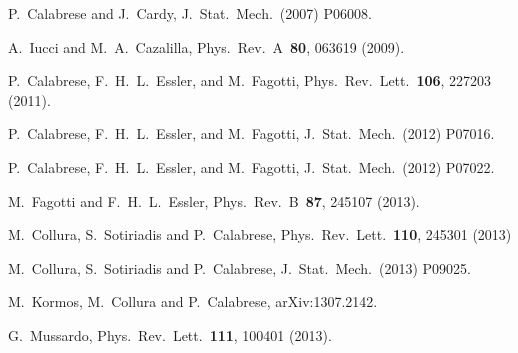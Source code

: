 \documentclass[twocolumn,superscriptaddress,prb,10pt]{revtex4-1}
\begin{document}
\begin{thebibliography}{99}
P.~Calabrese and J.~Cardy, J.\ Stat.\ Mech.\ (2007) P06008.

A.~Iucci and M.~A.~Cazalilla, Phys.\ Rev.\ A\ {\bf 80}, 063619 (2009).

P.~Calabrese, F.~H.~L.~Essler, and M.~Fagotti, Phys.\ Rev.\ Lett.\ {\bf106}, 227203 (2011).

P.~Calabrese, F.~H.~L.~Essler, and M.~Fagotti, J.\ Stat.\ Mech.\ (2012) P07016.

P.~Calabrese, F.~H.~L.~Essler, and M.~Fagotti, J.\ Stat.\ Mech.\ (2012) P07022.

M.~Fagotti and F.~H.~L.~Essler, Phys.\ Rev.\ B\ {\bf87}, 245107 (2013).


M.~Collura, S.~Sotiriadis and P.~Calabrese, Phys.\ Rev.\ Lett.\ {\bf 110}, 245301 (2013)

M.~Collura, S.~Sotiriadis and P.~Calabrese, J.\ Stat.\ Mech.\ (2013) P09025.

M.~Kormos, M.~Collura and P.~Calabrese, arXiv:1307.2142.

G.~Mussardo, Phys.\ Rev.\ Lett.\ {\bf 111}, 100401 (2013).

\end{thebibliography}
\end{document}
